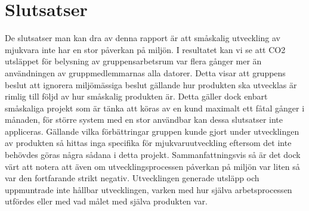 \section{Slutsatser}
\label{sec:joel_a-conclusion}

De slutsatser man kan dra av denna rapport är att småskalig utveckling av mjukvara inte har en stor påverkan på miljön. I resultatet kan vi se att CO2 utsläppet för belysning av gruppensarbetsrum var flera gånger mer än användningen av gruppmedlemmarnas alla datorer. Detta visar att gruppens beslut att ignorera miljömässiga beslut gällande hur produkten ska utvecklas är rimlig till följd av hur småskalig produkten är. Detta gäller dock enbart småskaliga projekt som är tänka att köras av en kund maximalt ett fåtal gånger i månaden, för större system med en stor användbar kan dessa slutsatser inte appliceras. Gällande vilka förbättringar gruppen kunde gjort under utvecklingen av produkten så hittas inga specifika för mjukvaruutveckling eftersom det inte behövdes göras några sådana i detta projekt. Sammanfattningsvis så är det dock värt att notera att även om utvecklingsprocessen påverkan på miljön var liten så var den fortfarande strikt negativ. Utvecklingen generade utsläpp och uppmuntrade inte hållbar utvecklingen, varken med hur själva arbetsprocessen utfördes eller med vad målet med själva produkten var.